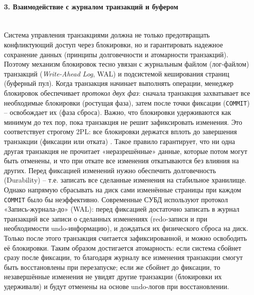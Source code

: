 \paragraph{3. Взаимодействие с журналом транзакций и буфером} ~\\
 Система управления транзакциями должна не только предотвращать конфликтующий доступ через блокировки, но и гарантировать надежное сохранение данных (принципы долговечности и атомарности транзакций). Поэтому механизм блокировок тесно увязан с журнальным файлом (лог-файлом) транзакций (\textit{Write-Ahead Log}, WAL) и подсистемой кеширования страниц (буферный пул). 
 Когда транзакция начинает выполнять операции, менеджер блокировок обеспечивает \textit{протокол двух фаз}: сначала транзакция захватывает все необходимые блокировки (ростущая фаза), затем после точки фиксации (\texttt{COMMIT}) – освобождает их (фаза сброса). Важно, что блокировки удерживаются как минимум до тех пор, пока транзакция не решит зафиксировать изменения. Это соответствует строгому 2PL: все блокировки держатся вплоть до завершения транзакции (фиксации или отката) \autocite{WashCoursesLec5}. Такое правило гарантирует, что ни одна другая транзакция не прочитает «неразрешённые» данные, которые потом могут быть отменены, и что при откате все изменения откатываются без влияния на других. 
 Перед фиксацией изменений нужно обеспечить долговечность (Durability) – т.е. записать все сделанные изменения на стабильное хранилище. Однако напрямую сбрасывать на диск сами изменённые страницы при каждом \texttt{COMMIT} было бы неэффективно. Современные СУБД используют протокол «Запись-журнала-до» (WAL): перед фиксацией достаточно записать в журнал транзакций все записи о сделанных изменениях (redo-записи и при необходимости undo-информацию), и дождаться их физического сброса на диск. Только после этого транзакция считается зафиксированной, и можно освободить её блокировки. Таким образом достигается атомарность: если система сбойнет сразу после фиксации, то благодаря журналу все изменения транзакции смогут быть восстановлены при перезапуске; если же сбойнет до фиксации, то незавершённые изменения не увидят другие транзакции (блокировки их удерживали) и будут отменены на основе undo-логов при восстановлении. ~\\
 
